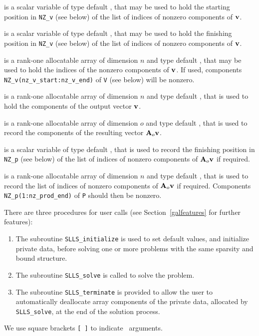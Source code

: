 \documentclass{galahad}
\newcommand{\packagename}{SLLS}
\begin{document}
\begin{description}

 is a scalar variable of type default \integer, that
may be used to hold the starting position in {\tt NZ\_v} (see below)
of the list of indices of nonzero components of ${\mathbf{v}}$.

 is a scalar variable of type default \integer, that
may be used to hold the finishing position in {\tt NZ\_v} (see below)
of the list of indices of nonzero components of ${\mathbf{v}}$.

 is a rank-one allocatable array of dimension $n$
and type default \integer, that may be used to hold the indices of the
nonzero components of ${\mathbf{v}}$. If used, components
{\tt NZ\_v(nz\_v\_start:nz\_v\_end)} of {\tt V} (see below) will be nonzero.

 is a rank-one allocatable array of dimension $n$
and type default \realdp, that is used to hold the components of the
output vector ${\mathbf{v}}$.

 is a rank-one allocatable array of dimension $o$
and type default \realdp, that is used to record the components of the
resulting vector ${\mathbf{A}}_o {\mathbf{v}}$.

 is a scalar variable of type default \integer, that
is used to record the finishing position in {\tt NZ\_p} (see below)
of the list of indices of nonzero components of ${\mathbf{A}}_o {\mathbf{v}}$ if required.

 is a rank-one allocatable array of dimension $n$
and type default \integer, that is used to record the list of
indices of nonzero components of ${\mathbf{A}}_o {\mathbf{v}}$ if required. Components
{\tt NZ\_p(1:nz\_prod\_end)} of {\tt P} should then be nonzero.

\end{description}


\galarguments
There are three procedures for user calls
(see Section~\ref{galfeatures} for further features):

\begin{enumerate}
\item The subroutine
      {\tt \packagename\_initialize}
      is used to set default values, and initialize private data,
      before solving one or more problems with the
      same sparsity and bound structure.
\item The subroutine
      {\tt \packagename\_solve}
      is called to solve the problem.
\item The subroutine
      {\tt \packagename\_terminate}
      is provided to allow the user to automatically deallocate array
       components of the private data, allocated by
       {\tt \packagename\_solve},
       at the end of the solution process.
\end{enumerate}
We use square brackets {\tt [ ]} to indicate \optional\ arguments.
\end{document}
